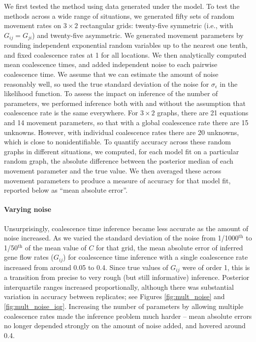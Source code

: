 \documentclass{article}
\begin{document}
We first tested the method using data generated under the model.
To test the methods across a wide range of situations,
we generated fifty sets of random movement rates on $3 \times 2$ rectangular grids:
twenty-five symmetric (i.e., with $G_{ij} = G_{ji}$) and twenty-five asymmetric.
We generated movement parameters
by rounding independent exponential random variables up to the nearest one tenth,
and fixed coalescence rates at 1 for all locations.
We then analytically computed mean coalescence times,
and added independent noise to each pairwise coalescence time.
We assume that we can estimate the amount of noise reasonably well,  
so used the true standard deviation of the noise for $\sigma_\epsilon$ in the likelihood function.
To assess the impact on inference of the number of parameters,
we performed inference both with and without the assumption 
that coalescence rate is the same everywhere.
For $3 \times 2$ graphs, there are 21 equations
and 14 movement parameters,
so that with a global coalescence rate there are 15 unknowns.
However, with individual coalescence rates there are 20 unknowns,
which is close to nonidentifiable.
To quantify accuracy across these random graphs in different situations,
we computed, for each model fit on a particular random graph,
the absolute difference between the posterior median of each movement parameter
and the true value.
We then averaged these across movement parameters to produce a measure of accuracy for that model fit,
reported below as ``mean absolute error''.


\paragraph{Varying noise}
Unsurprisingly, coalescence time inference became less accurate as the amount of noise increased.
As we varied the standard deviation of the noise 
from 1/1000${}^\text{th}$ to 1/50${}^\text{th}$ of the mean value of $C$ for that grid,
the mean absolute error of inferred gene flow rates ($G_{ij}$) 
for coalescence time inference with a single coalescence rate
increased from around 0.05 to 0.4.
Since true values of $G_{ij}$ were of order 1,
this is a transition from precise to very rough (but still informative) inference.
Posterior interquartile ranges increased proportionally,
although there was substantial variation in accuracy between replicates;
see Figures \ref{fig:mult_noise} and \ref{fig:mult_noise_iqr}.
Increasing the number of parameters by allowing multiple coalescence rates
made the inference problem much harder --
mean absolute errors no longer depended strongly on the amount of noise added,
and hovered around 0.4.
\end{document}
